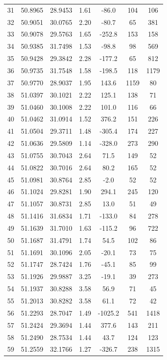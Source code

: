 \begin{longtable}{ccccccc}
31 & 50.8965 & 28.9453 & 1.61 & -86.0 & 104 & 106 \\
32 & 50.9051 & 30.0765 & 2.20 & -80.7 & 65 & 381 \\
33 & 50.9078 & 29.5763 & 1.65 & -252.8 & 153 & 158 \\
34 & 50.9385 & 31.7498 & 1.53 & -98.8 & 98 & 569 \\
35 & 50.9428 & 29.3842 & 2.28 & -177.2 & 65 & 812 \\
36 & 50.9735 & 31.7548 & 1.58 & -198.5 & 118 & 1179 \\
37 & 50.9770 & 28.9037 & 1.95 & 143.6 & 1159 & 80 \\
38 & 51.0397 & 30.1021 & 2.22 & 125.1 & 138 & 71 \\
39 & 51.0460 & 30.1008 & 2.22 & 101.0 & 116 & 66 \\
40 & 51.0462 & 31.0914 & 1.52 & 376.2 & 151 & 226 \\
41 & 51.0504 & 29.3711 & 1.48 & -305.4 & 174 & 227 \\
42 & 51.0636 & 29.5809 & 1.14 & -328.0 & 273 & 290 \\
43 & 51.0755 & 30.7043 & 2.64 & 71.5 & 149 & 52 \\
44 & 51.0822 & 30.7016 & 2.64 & 80.2 & 165 & 52 \\
45 & 51.0981 & 30.8764 & 2.85 & -2.0 & 52 & 52 \\
46 & 51.1024 & 29.8281 & 1.90 & 294.1 & 245 & 120 \\
47 & 51.1057 & 30.8731 & 2.85 & 13.0 & 51 & 49 \\
48 & 51.1416 & 31.6834 & 1.71 & -133.0 & 84 & 278 \\
49 & 51.1639 & 31.7010 & 1.63 & -115.2 & 96 & 722 \\
50 & 51.1687 & 31.4791 & 1.74 & 54.5 & 102 & 86 \\
51 & 51.1691 & 30.1096 & 2.05 & -20.1 & 73 & 75 \\
52 & 51.1747 & 28.7424 & 1.76 & -45.1 & 85 & 99 \\
53 & 51.1926 & 29.9887 & 3.25 & -19.1 & 39 & 273 \\
54 & 51.1937 & 30.8288 & 3.58 & 56.9 & 71 & 45 \\
55 & 51.2013 & 30.8282 & 3.58 & 61.1 & 72 & 42 \\
56 & 51.2293 & 28.7047 & 1.49 & -1025.2 & 541 & 1418 \\
57 & 51.2424 & 29.3694 & 1.44 & 377.6 & 143 & 211 \\
58 & 51.2490 & 28.7534 & 1.44 & 43.7 & 124 & 123 \\
59 & 51.2559 & 32.1766 & 1.27 & -326.7 & 238 & 1315 \\

\end{longtable}
